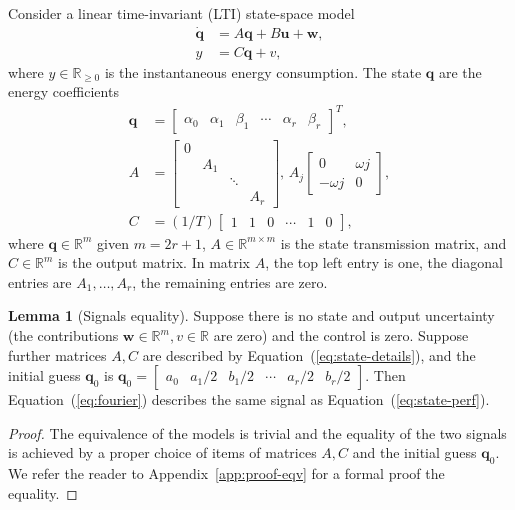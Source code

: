 \documentclass[letterpaper,10pt,conference]{ieeeconf}
\theoremstyle{definition}
\newtheorem{lem}[thm]{Lemma}
\begin{document}
Consider a linear time-invariant (LTI) state-space model
\begin{equation}\label{eq:state-perf}\begin{split}
  \dot{\mathbf{q}}&=A\mathbf{q}+B\mathbf{u}+\mathbf{w},\\
  y&=C\mathbf{q}+v,
\end{split}\end{equation}
where $y\in\mathbb{R}_{\geq 0}$ is the instantaneous energy consumption. The state $\mathbf{q}$ are the energy coefficients
\begin{equation}\label{eq:state-details}\begin{split}
  \mathbf{q}&=\left[\begin{array}{cccccc}
    \alpha_0 & \alpha_1 & \beta_1 & \cdots & \alpha_r & \beta_r
  \end{array}\right]^T,\\
  A&=\left[\begin{array}{cccc}
    0&    &       &  \\
     & A_1&       &  \\
     &    & \ddots&  \\
     &    &       & A_r 
  \end{array}\right],\,A_j\begin{bmatrix}0 & \omega j \\ -\omega j & 0\end{bmatrix},\\
  C&=(1/T)\left[\begin{array}{cccccc}
    1 & 1 & 0 &\cdots & 1 & 0
  \end{array}\right],
\end{split}\end{equation}
where $\mathbf{q}\in\mathbb{R}^m$ given $m=2r+1$, $A\in\mathbb{R}^{m\times m}$ is the state transmission matrix, and $C\in\mathbb{R}^m$ is the output matrix. In matrix $A$, the top left entry is one, the diagonal entries are $A_1,\dots,A_r$, the remaining entries are zero.

\begin{lem}[Signals equality]\label{lem:eqv}Suppose there is no state and output uncertainty (the contributions $\mathbf{w}\in\mathbb{R}^m,v\in\mathbb{R}$ are zero) and the control is zero. Suppose further matrices $A,C$ are described by Equation~(\ref{eq:state-details}), and the initial guess $\mathbf{q}_0$ is $\mathbf{q}_0=\begin{bmatrix}a_0 & a_1/2 & b_1/2 & \cdots & a_r/2 & b_r/2\end{bmatrix}$. Then Equation~(\ref{eq:fourier}) describes the same signal as Equation~(\ref{eq:state-perf}).
\end{lem}
\begin{proof}
The equivalence of the models is trivial and the equality of the two signals is achieved by a proper choice of items of matrices $A,C$ and the initial guess $\mathbf{q}_0$. We refer the reader to Appendix~\ref{app:proof-eqv} for a formal proof the equality.
\end{proof}
\end{document}
